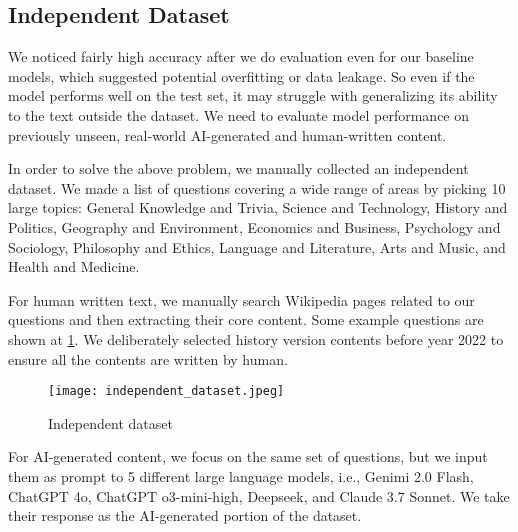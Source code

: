 \subsection{Independent Dataset}

We noticed fairly high accuracy after we do evaluation even for our baseline models, which suggested potential overfitting or data leakage. So even if the model performs well on the test set, it may struggle with generalizing its ability to the text outside the dataset. We need to evaluate model performance on previously unseen, real-world AI-generated and human-written content.

In order to solve the above problem, we manually collected an independent dataset. We made a list of questions covering a wide range of areas by picking 10 large topics: General Knowledge and Trivia, Science and Technology, History and Politics, Geography and Environment, Economics and Business, Psychology and Sociology, Philosophy and Ethics, Language and Literature, Arts and Music, and Health and Medicine.

For human written text, we manually search Wikipedia pages related to our questions and then extracting their core content. Some example questions are shown at \cref{fig:independent_dataset}. We deliberately selected history version contents before year 2022 to ensure all the contents are written by human. 

\begin{figure}[tb]
  \centering
  \texttt{[image: independent\_dataset.jpeg]}
  \vspace{-20pt}
  \caption{Independent dataset}
  \label{fig:independent_dataset}
\end{figure} 

For AI-generated content, we focus on the same set of questions, but we input them as prompt to 5 different large language models, i.e., Genimi 2.0 Flash, ChatGPT 4o, ChatGPT o3-mini-high, Deepseek, and Claude 3.7 Sonnet. We take their response as the AI-generated portion of the dataset.